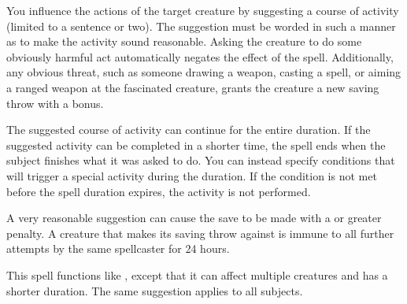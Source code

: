 \spellrng{\rngclose}
\begin{spelleffect}
  You influence the actions of the target creature by suggesting a course of activity (limited to a sentence or two). The suggestion must be worded in such a manner as to make the activity sound reasonable. Asking the creature to do some obviously harmful act automatically negates the effect of the spell. Additionally, any obvious threat, such as someone drawing a weapon, casting a spell, or aiming a ranged weapon at the fascinated creature, grants the creature a new saving throw with a  bonus.
  \par The suggested course of activity can continue for the entire duration. If the suggested activity can be completed in a shorter time, the spell ends when the subject finishes what it was asked to do. You can instead specify conditions that will trigger a special activity during the duration. If the condition is not met before the spell duration expires, the activity is not performed.
\end{spelleffect}
\begin{spellnotes}
  A very reasonable suggestion can cause the save to be made with a  or greater penalty. A creature that makes its saving throw against  is immune to all further attempts by the same spellcaster for 24 hours.
\end{spellnotes}

\spelldur{\durshort}
\begin{spelleffect}
  This spell functions like , except that it can affect multiple creatures and has a shorter duration. The same suggestion applies to all subjects.
\end{spelleffect}

